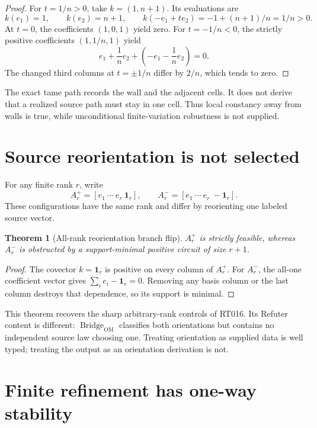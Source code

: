 \documentclass[11pt]{article}
\newtheorem{theorem}{Theorem}
\newcommand{\Bridge}{\operatorname{Bridge}_{\mathrm{OM}}}
\begin{document}
\begin{proof}
For $t=1/n>0$, take $k=(1,n+1)$.  Its evaluations are
\[
 k(e_1)=1,\qquad k(e_2)=n+1,\qquad
 k(-e_1+t e_2)=-1+(n+1)/n=1/n>0.
\]
At $t=0$, the coefficients $(1,0,1)$ yield zero.  For
$t=-1/n<0$, the strictly positive coefficients $(1,1/n,1)$ yield
\[
 e_1+\frac1n e_2+(-e_1-\frac1n e_2)=0.
\]
The changed third columns at $t=\pm1/n$ differ by $2/n$, which tends to zero.
\end{proof}

The exact tame path records the wall and the adjacent cells.  It does not
derive that a realized source path must stay in one cell.  Thus local
constancy away from walls is true, while unconditional finite-variation
robustness is not supplied.

\section{Source reorientation is not selected}

For any finite rank $r$, write
\[
 A_r^+=[e_1\ \cdots\ e_r\ \mathbf{1}_r],\qquad
 A_r^-=[e_1\ \cdots\ e_r\ -\mathbf{1}_r].
\]
These configurations have the same rank and differ by reorienting one labeled
source vector.

\begin{theorem}[All-rank reorientation branch flip]
$A_r^+$ is strictly feasible, whereas $A_r^-$ is obstructed by a
support-minimal positive circuit of size $r+1$.
\end{theorem}

\begin{proof}
The covector $k=\mathbf{1}_r$ is positive on every column of $A_r^+$.
For $A_r^-$, the all-one coefficient vector gives
$\sum_i e_i-\mathbf{1}_r=0$.  Removing any basis column or the last column
destroys that dependence, so its support is minimal.
\end{proof}

This theorem recovers the sharp arbitrary-rank controls of RT016.  Its Refuter
content is different: $\Bridge$ classifies both orientations but contains no
independent source law choosing one.  Treating orientation as supplied data is
well typed; treating the output as an orientation derivation is not.

\section{Finite refinement has one-way stability}
\end{document}

